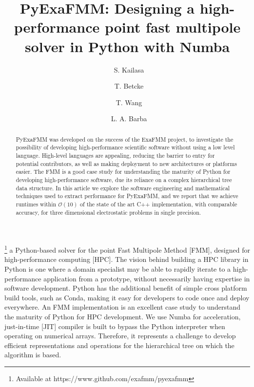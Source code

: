 \documentclass{IEEEcsmag}
\begin{document}

\title{PyExaFMM: Designing a high-performance point fast multipole solver in Python with Numba}

\author{\ S. Kailasa}

\author{\ T. Betcke}

\author{\ T. Wang}

\author{\ L. A. Barba}


\begin{abstract}
PyExaFMM was developed on the success of the ExaFMM project, to investigate the possibility of developing high-performance scientific software without using a low level language. High-level languages are appealing, reducing the barrier to entry for potential contributors, as well as making deployment to new architectures or platforms easier. The FMM is a good case study for understanding the maturity of Python for developing high-performance software, due its reliance on a complex hierarchical tree data structure. In this article we explore the software engineering and mathematical techniques used to extract performance for PyExaFMM, and we report that we achieve runtimes within $\mathcal{O}(10)$ of the state of the art C++ implementation, with comparable accuracy, for three dimensional electrostatic problems in single precision.

\end{abstract}

\maketitle
{}\footnote{Available at https://www.github.com/exafmm/pyexafmm} a Python-based solver for the point Fast Multipole Method [FMM], designed for high-performance computing [HPC]. The vision behind building a HPC library in Python is one where a domain specialist may be able to rapidly iterate to a high-performance application from a prototype, without necessarily having expertise in software development. Python has the additional benefit of simple cross platform build tools, such as Conda, making it easy for developers to code once and deploy everywhere. An FMM implementation is an excellent case study to understand the maturity of Python for HPC development. We use Numba for acceleration, just-in-time [JIT] compiler is built to bypass the Python interpreter when operating on numerical arrays. Therefore, it represents a challenge to develop efficient representations and operations for the hierarchical tree on which the algorithm is based.
\end{document}
